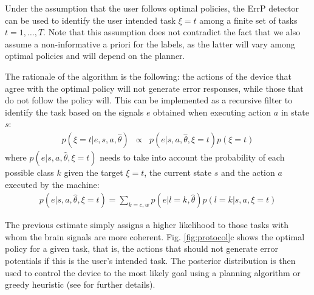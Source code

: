 \documentclass[10pt,letterpaper]{article}
\begin{document}
Under the assumption that the user follows optimal policies, the ErrP detector can be used to identify the user intended task $\xi = t$ among a finite set of tasks $t = 1,\ldots,T$. Note that this assumption does not contradict the fact that we also assume a non-informative a priori for the labels, as the latter will vary among optimal policies and will depend on the planner.

The rationale of the algorithm is the following: the actions of the device that agree with the optimal policy will not generate error responses, while those that do not follow the policy will. This can be implemented as a recursive filter to identify the task based on the signals $e$ obtained when executing action $a$ in state $s$:
%
\begin{eqnarray}
	p(\xi=t|e, s, a, \hat{\theta}) & \propto & p(e |s, a, \hat{\theta}, \xi=t) p(\xi=t)
	\label{eq:1}
\end{eqnarray}
%
where  $p(e |s, a, \hat{\theta}, \xi=t)$ needs to take into account the probability of each possible class $k$ given the target $\xi=t$, the current state $s$ and the action $a$ executed by the machine:
%
\begin{eqnarray}
	p(e |s, a, \hat{\theta}, \xi=t) =  \sum_{k = c,w} p(e |l = k, \hat{\theta}) p(l = k| s, a, \xi=t)
	\label{eq:2}
\end{eqnarray}

The previous estimate simply assigns a higher likelihood to those tasks with whom the brain signals are more coherent. Fig.  \ref{fig:protocol}c shows the optimal policy for a given task, that is, the actions that should not generate error potentials if this is the user's intended task. The posterior distribution is then used to control the device to the most likely goal using a planning algorithm or greedy heuristic (see \cite{iturrate13} for further details).
\end{document}
